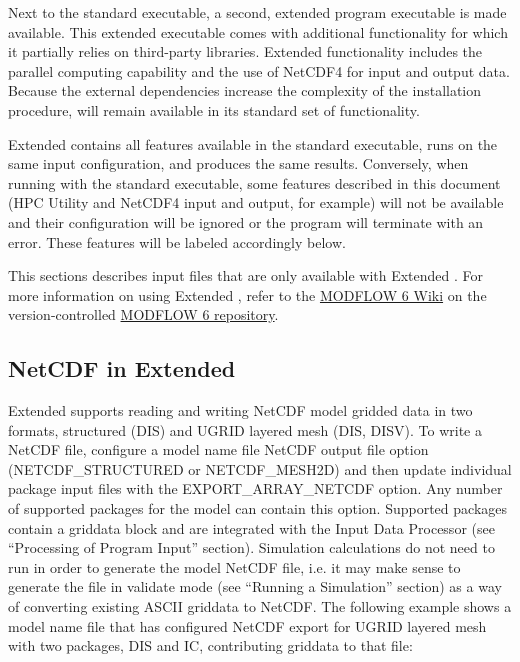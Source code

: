 Next to the standard \mf executable, a second, extended program executable is made available. This extended executable comes with additional functionality for which it partially relies on third-party libraries. Extended functionality includes the parallel computing capability and the use of NetCDF4 for input and output data. Because the external dependencies increase the complexity of the installation procedure, \mf will remain available in its standard set of functionality.

Extended \mf contains all features available in the standard executable, runs on the same input configuration, and produces the same results. Conversely, when running with the standard executable, some features described in this document (HPC Utility and NetCDF4 input and output, for example) will not be available and their configuration will be ignored or the program will terminate with an error. These features will be labeled accordingly below.

This sections describes input files that are only available with Extended \mf.  For more information on using Extended \mf, refer to the \href{https://github.com/MODFLOW-ORG/modflow6/wiki}{MODFLOW 6 Wiki} on the version-controlled \href{https://github.com/MODFLOW-ORG/modflow6}{MODFLOW 6 repository}.

\newpage
\subsection{NetCDF in Extended \mf}
Extended \mf supports reading and writing NetCDF model gridded data in two formats, structured (DIS) and UGRID layered mesh (DIS, DISV). To write a NetCDF file, configure a model name file NetCDF output file option (NETCDF\_STRUCTURED or NETCDF\_MESH2D) and then update individual package input files with the EXPORT\_ARRAY\_NETCDF option. Any number of supported packages for the model can contain this option. Supported packages contain a griddata block and are integrated with the Input Data Processor (see ``Processing of Program Input'' section). Simulation calculations do not need to run in order to generate the model NetCDF file, i.e. it may make sense to generate the file in \mf validate mode (see ``Running a Simulation'' section) as a way of converting existing ASCII griddata to NetCDF. The following example shows a model name file that has configured NetCDF export for UGRID layered mesh with two packages, DIS and IC, contributing griddata to that file:


